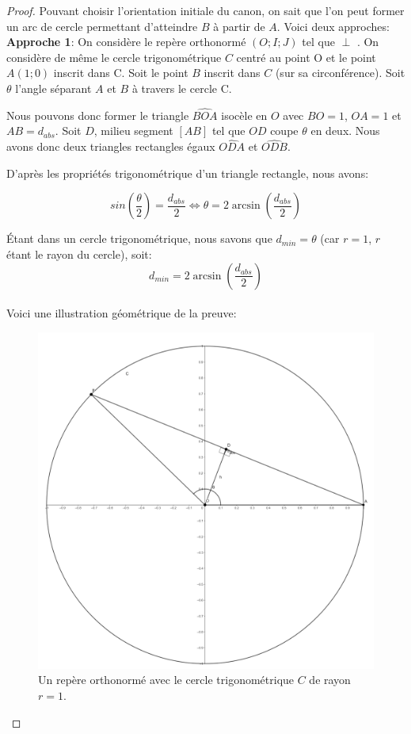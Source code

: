 \documentclass{amsart}
\theoremstyle{definition}
\theoremstyle{remark}
\numberwithin{equation}{section}
\renewcommand*{\overrightarrow}[1]{\vbox{\halign{##\cr 
  \tiny\rightarrowfill\cr\noalign{\nointerlineskip\vskip1pt} 
  $#1\mskip2mu$\cr}}}
\begin{document}
\begin{proof}
  Pouvant choisir l'orientation initiale du canon, on sait que l'on peut former un arc de cercle permettant d'atteindre $B$ à partir de $A$.
  Voici deux approches:\\

  \textbf{Approche 1}: On considère le repère orthonormé $(O;I;J)$ tel que \overrightarrow{OI} $\perp$ \overrightarrow{OJ}. On considère de même le cercle trigonométrique $C$ centré au point O et le point $A(1;0)$ inscrit dans C. Soit le point
  $B$ inscrit dans $C$ (sur sa circonférence).
  Soit $\theta$ l'angle séparant $A$ et $B$ à travers le cercle C.

  Nous pouvons donc former le triangle $\widehat{BOA}$ isocèle en $O$ avec $BO=1$, $OA=1$ et $AB=d_{abs}$. Soit $D$, milieu segment $[AB]$ tel que $OD$ coupe $\theta$ en deux. Nous avons donc deux triangles rectangles égaux $\widehat{ODA}$ et $\widehat{ODB}$.

  D'après les propriétés trigonométrique d'un triangle rectangle, nous avons:

  \[sin(\frac{\theta}{2})=\frac{d_{abs}}{2} \Leftrightarrow \theta = 2\arcsin (\frac{d_{abs}}{2})\]

  Étant dans un cercle trigonométrique, nous savons que $d_{min}=\theta$ (car $r=1$, $r$ étant le rayon du cercle), soit:
  \[d_{min}=2\arcsin (\frac{d_{abs}}{2})\] \\

  Voici une illustration géométrique de la preuve:

  \begin{figure}[H]
    \centering
    \includegraphics[scale=0.17]{images/angle.png}
    \caption{Un repère orthonormé avec le cercle trigonométrique $C$ de rayon $r=1$.}
  \end{figure}


\end{proof}
\end{document}
